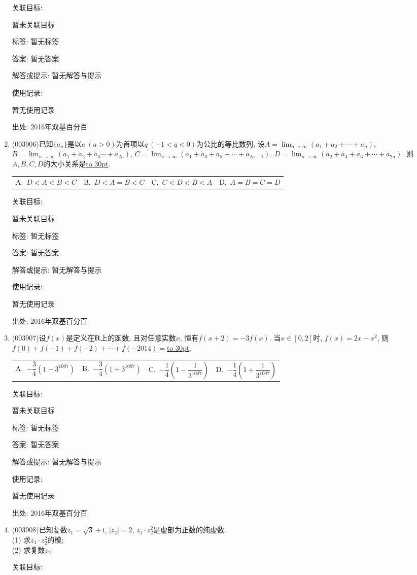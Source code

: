 \documentclass[10pt,a4paper]{article}
\newcommand{\blank}[1]{\underline{\hbox to #1pt{}}}
\newcommand{\fourch}[4]{\par\begin{tabular}{p{.23\textwidth}p{.23\textwidth}p{.23\textwidth}p{.23\textwidth}}
A.~#1 &B.~#2& C.~#3& D.~#4
\end{tabular}}
\begin{document}
\begin{enumerate}[1.]
关联目标:

暂未关联目标



标签: 暂无标签

答案: 暂无答案

解答或提示: 暂无解答与提示

使用记录:

暂无使用记录


出处: 2016年双基百分百
\item { (003906)}已知$\{a_n\}$是以$a \ (a>0)$为首项以$q \ (-1<q<0)$为公比的等比数列, 设$A=\displaystyle\lim_{n\to \infty}(a_1+a_2+\cdots+a_n)$, $B=\displaystyle\lim_{n\to \infty}(a_1+a_2+a_3\cdots+a_{2n})$, $C=\displaystyle\lim_{n\to \infty}(a_1+a_3+a_5+\cdots+a_{2n-1})$, $D=\displaystyle\lim_{n\to \infty}(a_2+a_4+a_6+\cdots+a_{2n})$. 则$A,B,C,D$的大小关系是\blank{30}.
\fourch{$D<A<B<C$}{$D<A=B<C$}{$C<D<B<A$}{$A=B=C=D$}


关联目标:

暂未关联目标



标签: 暂无标签

答案: 暂无答案

解答或提示: 暂无解答与提示

使用记录:

暂无使用记录


出处: 2016年双基百分百
\item { (003907)}设$f(x)$是定义在$\mathbf{R}$上的函数, 且对任意实数$x$, 恒有$f(x+2)=-3f(x)$. 当$x\in [0,2]$时, $f(x)=2x-x^2$, 则$f(0)+f(-1)+f(-2)+\cdots+f(-2014)=$\blank{30}.
\fourch{$-\dfrac 34(1-3^{1007})$}{$-\dfrac 34(1+3^{1007})$}{$-\dfrac 14\left(1-\dfrac{1}{3^{1007}}\right)$}{$-\dfrac 14\left(1+\dfrac{1}{3^{1007}}\right)$}


关联目标:

暂未关联目标



标签: 暂无标签

答案: 暂无答案

解答或提示: 暂无解答与提示

使用记录:

暂无使用记录


出处: 2016年双基百分百
\item { (003908)}已知复数$z_1=\sqrt{3}+\mathrm{i}$, $|z_2|=2$, $z_1\cdot z_2^2$是虚部为正数的纯虚数.\\
(1) 求$z_1\cdot z_2^2$的模;\\
(2) 求复数$z_2$.


关联目标:


\end{enumerate}
\end{document}
